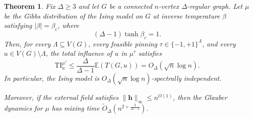 \documentclass[11pt,a4paper]{article}
\theoremstyle{plain}
\newtheorem{theorem}{Theorem}
\begin{document}
\begin{theorem}\label{thm:critical-Ising}
Fix $\Delta \geq 3$ and let $G$ be a connected $n$-vertex $\Delta$-regular graph.
Let $\mu$ be the Gibbs distribution of the Ising model on $G$ at inverse temperature $\beta$ satisfying $|\beta|=\beta_c$, where
\[
(\Delta-1)\tanh\beta_c=1.
\]
Then, for every $\Lambda\subseteq V(G)$, every feasible pinning $\tau\in\{-1,+1\}^{\Lambda}$, and every $u\in V(G)\setminus\Lambda$, the total influence of $u$ in $\mu^\tau$ satisfies
\[
\mathrm{TI}^{\mu^\tau}_u\le \frac{\Delta}{\Delta-1}\mathbb{E}(T(G,u))=O_\Delta(\sqrt{n}\log n).
\]
In particular, the Ising model is $O_\Delta(\sqrt{n}\log n)$-spectrally independent.

Moreover, if the external field satisfies $\|\boldsymbol h\|_\infty \le n^{O(1)}$, then the Glauber dynamics for $\mu$ has mixing time 
$\widetilde{O}_\Delta\!\left(n^{2+ \frac{2}{\Delta - 2}}\right)$.
\end{theorem}
\end{document}
